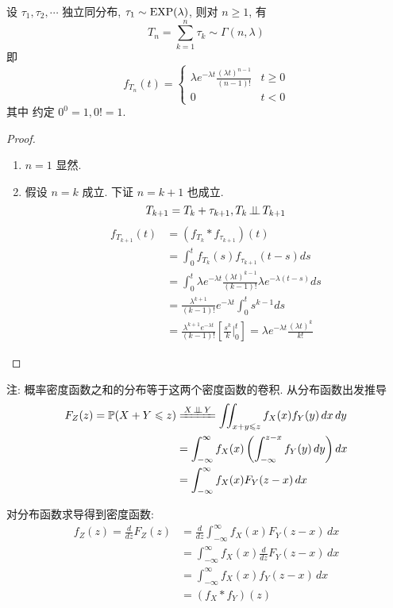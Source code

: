 \begin{theorem}[指数分布随机变量之和]
    设 $\tau_1,\tau_2,\cdots$ 独立同分布, $\tau_1\sim\operatorname{EXP}(\lambda)$, 则对 $n\geq 1$, 有
    \begin{equation}
        T_n=\sum_{k=1}^n\tau_k\sim \Gamma (n,\lambda)
    \end{equation}
    即
    \begin{equation}
        f_{T_n}(t)=\begin{cases}
            \lambda e^{-\lambda t}\frac{(\lambda t)^{n-1}}{(n-1)!} & t\geq 0\\
            0 & t<0
        \end{cases}
    \end{equation}
    其中 约定 $0^0=1, 0!=1$.
\end{theorem}

\begin{proof}
\begin{enumerate}
    \item $n=1$ 显然.
    \item 假设 $n=k$ 成立. 下证 $n=k+1$ 也成立.
    \[
    T_{k+1}=T_k+\tau_{k+1}, T_k\operatorname{\perp\!\!\!\perp} T_{k+1}
    \]
    \[
    \begin{aligned}
        f_{T_{k+1}}(t)&=(f_{T_k}*f_{\tau_{k+1}})(t)\\
        &=\int_0^t f_{T_k}(s)f_{\tau_{k+1}}(t-s)ds\\
        &=\int_0^t \lambda e^{-\lambda t}\frac{(\lambda t)^{k-1}}{(k-1)!}\lambda e^{-\lambda (t-s)}ds\\
        &=\frac{\lambda^{k+1}}{(k-1)!}e^{-\lambda t}\int_0^t s^{k-1}ds\\
        &=\frac{\lambda^{k+1}e^{-\lambda t}}{(k-1)!}\left[\frac{s^k}{k}\bigg|^t_0\right]=\lambda e^{-\lambda t}\frac{(\lambda t)^k}{k!}
    \end{aligned}
    \]
\end{enumerate}
\end{proof}

注: 概率密度函数之和的分布等于这两个密度函数的卷积. 从分布函数出发推导
\[
\begin{aligned}
F_Z(z) = \mathbb{P}(X + Y \leq z)&\xlongequal{X\ind Y} \iint_{x + y \leq z} f_X(x) f_Y(y) \, dx\,dy \\
&= \int_{-\infty}^\infty f_X(x) \left( \int_{-\infty}^{z - x} f_Y(y) \, dy \right) dx \\
&= \int_{-\infty}^\infty f_X(x) F_Y(z - x) \, dx
\end{aligned}
\]

对分布函数求导得到密度函数:
\[
\begin{aligned}
f_Z(z) = \frac{d}{dz} F_Z(z) &= \frac{d}{dz} \int_{-\infty}^\infty f_X(x) F_Y(z - x) \, dx \\
&= \int_{-\infty}^\infty f_X(x) \frac{d}{dz} F_Y(z - x) \, dx \\
&= \int_{-\infty}^\infty f_X(x) f_Y(z - x) \, dx \\
&= (f_X * f_Y)(z)
\end{aligned}
\]

